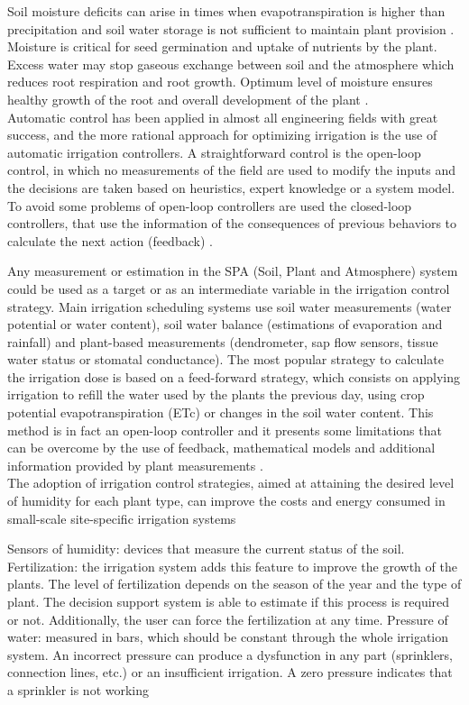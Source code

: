 \documentclass[letterpaper, 10 pt, conference]{ieeeconf}  %
\begin{document}
Soil moisture deficits can arise in times when evapotranspiration is higher than precipitation and soil water storage is not sufficient to maintain plant provision \cite{riediger2016modelling}. Moisture is critical for seed germination and uptake of nutrients by the plant. Excess water may stop gaseous exchange between soil and the atmosphere which reduces root respiration and root growth. Optimum level of moisture ensures healthy growth of the root and overall development of the plant \cite{Gawali}.\\

Automatic control has been applied in almost all engineering fields with great success, and the more rational approach for optimizing irrigation is the use of automatic irrigation controllers. A straightforward control is the open-loop control, in which no measurements of the field are used to modify the inputs and the decisions are taken based on heuristics, expert knowledge or a system model. To avoid some problems of open-loop controllers are used the closed-loop controllers, that use the information of the consequences of previous behaviors to calculate the next action (feedback) \cite{Romero2012}. 

Any measurement or estimation in the SPA (Soil, Plant and Atmosphere) system could be used as a target or as an intermediate variable in the irrigation control strategy. Main irrigation scheduling systems use soil water measurements (water potential or water content), soil water balance (estimations of evaporation and rainfall) and plant-based measurements (dendrometer, sap ﬂow sensors, tissue water status or stomatal conductance). The most popular strategy to calculate the irrigation dose is based on a feed-forward strategy, which consists on applying irrigation to refill the water used by the plants the previous day, using crop potential evapotranspiration (ETc) or changes in the soil water content. This method is in fact an open-loop controller and it presents some limitations that can be overcome by the use of feedback, mathematical models and additional information provided by plant measurements \cite{Romero2012}.\\


The adoption of irrigation control strategies, aimed at attaining the desired level of humidity for each plant type, can improve the costs and energy consumed in small-scale site-speciﬁc irrigation systems \cite{Isern2012}

Sensors of humidity: devices that measure the current status of the soil. Fertilization: the irrigation system adds this feature to improve the growth of the plants. The level of fertilization depends on the season of the year and the type of plant. The decision support system is able to estimate if this process is required or not. Additionally, the user can force the fertilization at any time. Pressure of water: measured in bars, which should be constant through the whole irrigation system. An incorrect pressure can produce a dysfunction in any part (sprinklers, connection lines, etc.) or an insufficient irrigation. A zero pressure indicates that a sprinkler is not working \cite{Isern2012}
\end{document}
